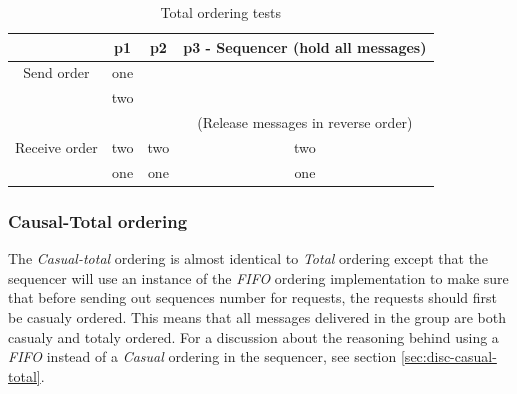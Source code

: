 \documentclass[titlepage, twocolumn, a4paper, 10pt]{article}
\begin{document}
\begin{table}[H]
  \centering
  \begin{footnotesize}
    \begin{tabular} {c | c | c | c}
      & p1 & p2 & p3 - Sequencer (hold all messages) \\
      \hline
      Send order & one &  &  \\
      & two &  &  \\
      \hline
      &  &  & (Release messages in reverse order) \\
      \hline
      Receive order & two & two & two \\
      & one & one & one \\
    \end{tabular}
  \end{footnotesize}
  \caption{Total ordering tests}
  \label{tbl:totalseq}
\end{table}

\subsubsection{Causal-Total ordering}\label{sec:causal-total}
The \textit{Casual-total} ordering is almost identical to
\textit{Total} ordering except that the sequencer will use an instance
of the \textit{FIFO} ordering implementation to make sure that before
sending out sequences number for requests, the requests should first
be casualy ordered. This means that all messages delivered in the
group are both casualy and totaly ordered. For a discussion about the
reasoning behind using a \textit{FIFO} instead of a \textit{Casual}
ordering in the sequencer, see section \ref{sec:disc-casual-total}.
\end{document}
